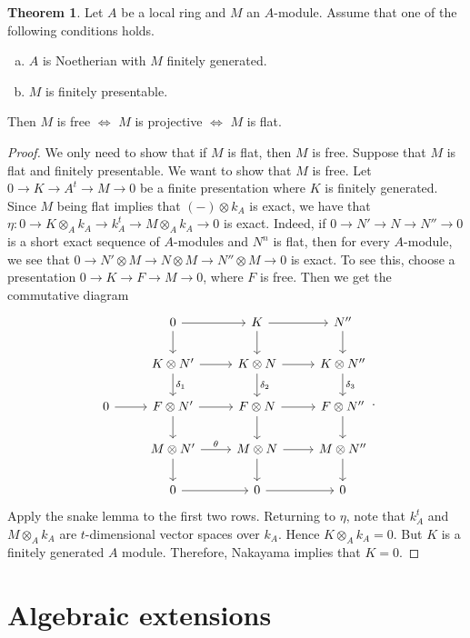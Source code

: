 \documentclass[10pt,letterpaper,cm]{nupset}
\theoremstyle{definition}
\newtheorem{theorem}{Theorem}
\newcommand{\1}{\mathbf{1}}
\newcommand{\0}{\vec 0}
\begin{document}
\begin{theorem}
Let $A$ be a local ring and $M$ an $A$-module. Assume that one of the following conditions holds.
\begin{enumerate}[(a)]
\item $A$ is Noetherian with $M$ finitely generated.
\item $M$ is finitely presentable.
\end{enumerate}
Then $M$ is free $\iff$ $M$ is projective $\iff$ $M$ is flat.
\end{theorem}
\begin{proof}
We only need to show that if $M$ is flat, then $M$ is free. Suppose that $M$ is flat and finitely presentable. We want to show that $M$ is free. Let $0 \to K \to A^t \to M \to 0$ be a finite presentation  where $K$ is finitely generated. Since $M$ being flat implies that $(-) \otimes k_A$ is exact, we have that $\eta : 0 \to K \otimes_A k_A \to k_A^t \to M \otimes_A k_A \to 0$ is exact. Indeed, if $0 \to N' \to N \to N'' \to 0$ is a short exact sequence of $A$-modules and $N^n$ is flat, then for every $A$-module, we see that $0 \to N' \otimes M \to N \otimes M \to N'' \otimes M \to 0$ is exact. To see this, choose a presentation $0 \to K \to F \to M \to 0$, where $F$ is free. Then we get the commutative diagram
\[
\begin{tikzcd}
 & 0 \arrow[r] \arrow[d] & K \arrow[r] \arrow[d] & N'' \arrow[d] \\
 & K \otimes N' \arrow[r] \arrow[d, "\delta_1"] & K \otimes N \arrow[r] \arrow[d, "\delta_2"] & K \otimes N'' \arrow[d, "\delta_3"] \\
0 \arrow[r] & F \otimes N' \arrow[r] \arrow[d] & F \otimes N \arrow[r] \arrow[d] & F \otimes N'' \arrow[d] \\
 & M \otimes N' \arrow[r, "\theta"] \arrow[d] & M \otimes N \arrow[r] \arrow[d] & M \otimes N'' \arrow[d] \\
 & 0 \arrow[r] & 0 \arrow[r] & 0
\end{tikzcd}
.\]  Apply the snake lemma to the first two rows.  Returning to $\eta$, note that $k_A^t$ and $M \otimes_A k_A$ are $t$-dimensional vector spaces over $k_A$. Hence $K \otimes_A k_A = 0$. But $K$ is a finitely generated $A$ module. Therefore, Nakayama implies  that $K = 0$. 
\end{proof}

\section{Algebraic extensions}
\end{document}
